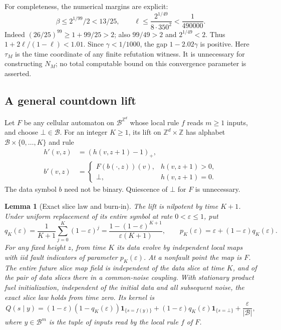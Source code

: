 \documentclass[11pt]{article}
\theoremstyle{plain}
\newtheorem{lemma}[theorem]{Lemma}
\theoremstyle{definition}
\theoremstyle{remark}
\newcommand{\Z}{\mathbb Z}
\newcommand{\eps}{\varepsilon}
\newcommand{\ind}{\mathbf 1}
\begin{document}
For completeness, the numerical margins are explicit:
\[
 \beta\le2^{1/99}/2<13/25,\qquad
 \ell\le\frac{2^{1/49}}{8\cdot350^2}<\frac1{490000}.
\]
Indeed $(26/25)^{99}\ge1+99/25>2$; also $99/49>2$ and $2^{1/49}<2$. Thus $1+2\ell/(1-\ell)<1.01$. Since $\gamma<1/1000$, the gap $1-2.02\gamma$ is positive. Here $\tau_M$ is the time coordinate of any finite refutation witness. It is unnecessary for constructing $N_M$; no total computable bound on this convergence parameter is asserted.

\subsection{A general countdown lift}

Let $F$ be any cellular automaton on $\mathcal B^{\Z^d}$ whose local rule $f$ reads $m\ge1$ inputs, and choose $\bot\in\mathcal B$. For an integer $K\ge1$, its lift on $\Z^d\times\Z$ has alphabet $\mathcal B\times\{0,\ldots,K\}$ and rule
\begin{align}
 h'(v,z)&=(h(v,z+1)-1)_+,\label{eq:nu-lift-h}\\
 b'(v,z)&=
 \begin{cases}
 F(b(\cdot,z))(v),&h(v,z+1)>0,\\
 \bot,&h(v,z+1)=0 .
 \end{cases}\label{eq:nu-lift-b}
\end{align}
The data symbol $b$ need not be binary. Quiescence of $\bot$ for $F$ is unnecessary.

\begin{lemma}[Exact slice law and burn-in]\label{lem:nu-slice}
The lift is nilpotent by time $K+1$. Under uniform replacement of its entire symbol at rate $0<\eps\le1$, put
\[
 q_K(\eps)=\frac1{K+1}\sum_{j=0}^K(1-\eps)^j
          =\frac{1-(1-\eps)^{K+1}}{\eps(K+1)},\qquad
 p_K(\eps)=\eps+(1-\eps)q_K(\eps).
\]
For any fixed height $z$, from time $K$ its data evolve by independent local maps with iid fault indicators of parameter $p_K(\eps)$. At a nonfault point the map is $F$. The entire future slice map field is independent of the data slice at time $K$, and of the pair of data slices there in a common-noise coupling. With stationary product fuel initialization, independent of the initial data and all subsequent noise, the exact slice law holds from time zero. Its kernel is
\begin{equation}\label{eq:nu-Q}
 Q(s\mid y)=(1-\eps)(1-q_K(\eps))\ind_{\{s=f(y)\}}
 +(1-\eps)q_K(\eps)\ind_{\{s=\bot\}}+\frac{\eps}{|\mathcal B|},
\end{equation}
where $y\in\mathcal B^m$ is the tuple of inputs read by the local rule $f$ of $F$.
\end{lemma}
\end{document}
